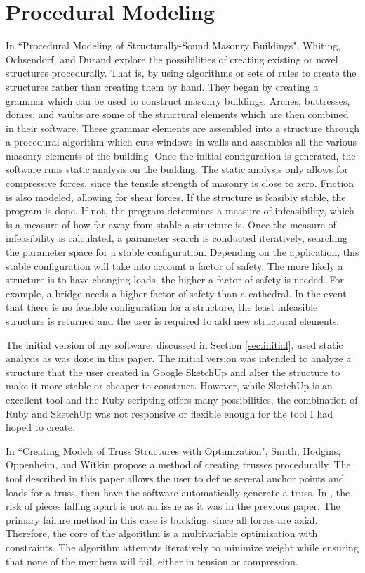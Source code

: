 \documentclass{thesis}
\begin{document}
\section{Procedural Modeling}
In ``Procedural Modeling of Structurally-Sound Masonry Buildings"\cite{whiting:2009}, Whiting, Ochsendorf, and Durand explore
the possibilities of creating existing or novel structures procedurally.  That is, by using algorithms or
sets of rules to create the structures rather than creating them by hand.  They began by creating a grammar
which can be used to construct masonry buildings.  Arches, buttresses, domes, and vaults are some of the
structural elements which are then combined in their software.  These grammar elements are assembled into
a structure through a procedural algorithm which cuts windows in walls and assembles
all the various masonry elements of the building.  Once the initial configuration is
generated, the software runs static analysis on the building.  The static analysis only allows for compressive
forces, since the tensile strength of masonry is close to zero.  Friction is also modeled, allowing for shear
forces.  If the structure is feasibly stable, the program is done.  If not, the program determines a measure
of infeasibility, which is a measure of how far away from stable a structure is.  Once the measure
of infeasibility is calculated, a parameter search is conducted iteratively, searching the parameter space
for a stable configuration.  Depending on the application, this stable configuration will take into account
a factor of safety.  The more likely a structure is to have changing loads, the higher a factor of
safety is needed.  For example, a bridge needs a higher factor of safety than a cathedral.  In the event
that there is no feasible configuration for a structure, the least infeasible structure is returned and the
user is required to add new structural elements.

The initial version of my software, discussed in Section \ref{sec:initial}, used static analysis as was done
in this paper.  The initial version was intended to analyze a structure that the user created in Google
SketchUp\cite{sketchup} and alter the structure to make it more stable or cheaper to construct.  However,
while SketchUp is an excellent tool and the Ruby scripting offers many possibilities, the combination of
Ruby and SketchUp was not responsive or flexible enough for the tool I had hoped to create.

In ``Creating Models of Truss Structures with Optimization"\cite{Carnegie02creatingmodels}, Smith, Hodgins,
Oppenheim, and Witkin propose a method of creating trusses procedurally.  The tool described in this paper allows the user to define
several anchor points and loads for a truss, then have the software automatically generate a truss.  In \cite{Carnegie02creatingmodels},
the risk of pieces falling apart is not an issue as it was in the previous paper.  The primary failure
method in this case is buckling, since all forces are axial.  Therefore, the core of the algorithm is a
multivariable optimization with constraints.  The algorithm attempts iteratively to minimize weight
while ensuring that none of the members will fail, either in tension or compression.
\end{document}
